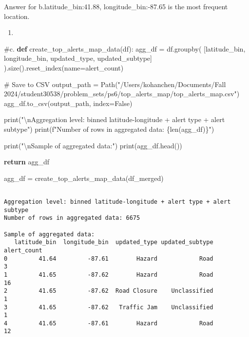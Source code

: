 \documentclass[
  letterpaper,
  DIV=11,
  numbers=noendperiod]{scrartcl}
\newenvironment{Shaded}{\begin{snugshade}}{\end{snugshade}}
\newcommand{\BuiltInTok}[1]{\textcolor[rgb]{0.00,0.23,0.31}{#1}}
\newcommand{\CharTok}[1]{\textcolor[rgb]{0.13,0.47,0.30}{#1}}
\newcommand{\CommentTok}[1]{\textcolor[rgb]{0.37,0.37,0.37}{#1}}
\newcommand{\ControlFlowTok}[1]{\textcolor[rgb]{0.00,0.23,0.31}{\textbf{#1}}}
\newcommand{\KeywordTok}[1]{\textcolor[rgb]{0.00,0.23,0.31}{\textbf{#1}}}
\newcommand{\NormalTok}[1]{\textcolor[rgb]{0.00,0.23,0.31}{#1}}
\newcommand{\OperatorTok}[1]{\textcolor[rgb]{0.37,0.37,0.37}{#1}}
\newcommand{\SpecialCharTok}[1]{\textcolor[rgb]{0.37,0.37,0.37}{#1}}
\newcommand{\SpecialStringTok}[1]{\textcolor[rgb]{0.13,0.47,0.30}{#1}}
\newcommand{\StringTok}[1]{\textcolor[rgb]{0.13,0.47,0.30}{#1}}
\newcommand{\VariableTok}[1]{\textcolor[rgb]{0.07,0.07,0.07}{#1}}
\providecommand{\tightlist}{%
  \setlength{\itemsep}{0pt}\setlength{\parskip}{0pt}}\usepackage{longtable,booktabs,array}
\begin{document}
Answer for b.latitude\_bin:41.88, longitude\_bin:-87.65 is the most
frequent location.

\begin{enumerate}
\def\labelenumi{\alph{enumi}.}
\setcounter{enumi}{2}
\tightlist
\item
\end{enumerate}

\begin{Shaded}
\begin{Highlighting}[]
\CommentTok{\#c.}
\KeywordTok{def}\NormalTok{ create\_top\_alerts\_map\_data(df):}
\NormalTok{    agg\_df }\OperatorTok{=}\NormalTok{ df.groupby(}
\NormalTok{        [}\StringTok{\textquotesingle{}latitude\_bin\textquotesingle{}}\NormalTok{, }\StringTok{\textquotesingle{}longitude\_bin\textquotesingle{}}\NormalTok{, }\StringTok{\textquotesingle{}updated\_type\textquotesingle{}}\NormalTok{, }\StringTok{\textquotesingle{}updated\_subtype\textquotesingle{}}\NormalTok{]}
\NormalTok{    ).size().reset\_index(name}\OperatorTok{=}\StringTok{\textquotesingle{}alert\_count\textquotesingle{}}\NormalTok{)}
    
    \CommentTok{\# Save to CSV}
\NormalTok{    output\_path }\OperatorTok{=}\NormalTok{ Path(}\StringTok{"/Users/kohanchen/Documents/Fall 2024/student30538/problem\_sets/ps6/top\_alerts\_map/top\_alerts\_map.csv"}\NormalTok{)}
\NormalTok{    agg\_df.to\_csv(output\_path, index}\OperatorTok{=}\VariableTok{False}\NormalTok{)}
    
    \BuiltInTok{print}\NormalTok{(}\StringTok{"}\CharTok{\textbackslash{}n}\StringTok{Aggregation level: binned latitude{-}longitude + alert type + alert subtype"}\NormalTok{)}
    \BuiltInTok{print}\NormalTok{(}\SpecialStringTok{f"Number of rows in aggregated data: }\SpecialCharTok{\{}\BuiltInTok{len}\NormalTok{(agg\_df)}\SpecialCharTok{\}}\SpecialStringTok{"}\NormalTok{)}
    
    \BuiltInTok{print}\NormalTok{(}\StringTok{"}\CharTok{\textbackslash{}n}\StringTok{Sample of aggregated data:"}\NormalTok{)}
    \BuiltInTok{print}\NormalTok{(agg\_df.head())}
    
    \ControlFlowTok{return}\NormalTok{ agg\_df}

\NormalTok{agg\_df }\OperatorTok{=}\NormalTok{ create\_top\_alerts\_map\_data(df\_merged)}
\end{Highlighting}
\end{Shaded}

\begin{verbatim}

Aggregation level: binned latitude-longitude + alert type + alert subtype
Number of rows in aggregated data: 6675

Sample of aggregated data:
   latitude_bin  longitude_bin  updated_type updated_subtype  alert_count
0         41.64         -87.61        Hazard            Road            3
1         41.65         -87.62        Hazard            Road           16
2         41.65         -87.62  Road Closure    Unclassified            1
3         41.65         -87.62   Traffic Jam    Unclassified            1
4         41.65         -87.61        Hazard            Road           12
\end{verbatim}
\end{document}
